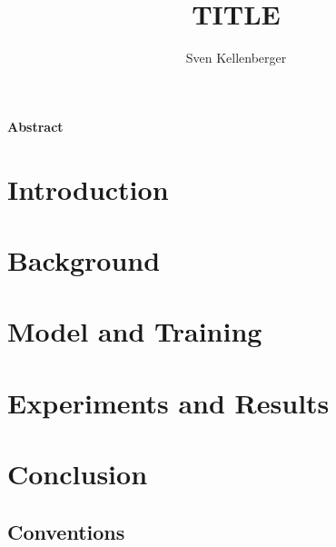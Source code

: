 \documentclass[a4paper]{report}
\begin{document}
\pagestyle{fancyplain} \thispagestyle{empty}

\title{TITLE}
\author{Sven Kellenberger}

 \setcounter{page}{1}
\maketitle

\newpage
\thispagestyle{empty}
\vspace{8cm}
\noindent
{\centerline {\bf \large Abstract}}
\vspace{1cm}


\noindent



 \setcounter{page}{1}
\tableofcontents
\newpage{\pagestyle{empty} \cleardoublepage}

 \setcounter{page}{1}
\pagestyle{fancy}

\chapter{Introduction}

\newpage{\pagestyle{empty} \cleardoublepage}

\chapter{Background}

\newpage{\pagestyle{empty} \cleardoublepage}

\chapter{Model and Training}

\newpage{\pagestyle{empty} \cleardoublepage}

\chapter{Experiments and Results}

\newpage{\pagestyle{empty} \cleardoublepage}

\chapter{Conclusion}

\newpage{\pagestyle{empty} \cleardoublepage}

\begin{appendix}
\chapter{Conventions}

\newpage{\pagestyle{empty} \cleardoublepage}
\end{appendix}
\end{document}
